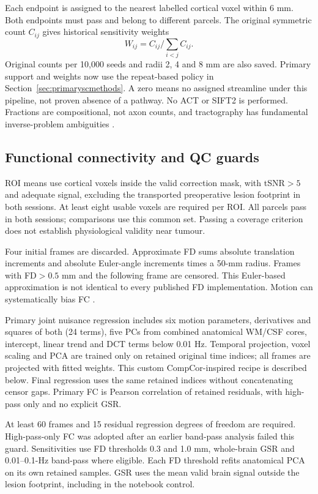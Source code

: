 \documentclass[11pt,a4paper]{article}
\begin{document}
Each endpoint is assigned to the nearest labelled cortical voxel within 6 mm. Both endpoints must pass and belong to different parcels. The original symmetric count $C_{ij}$ gives historical sensitivity weights
\begin{equation}W_{ij}=C_{ij}/\sum_{i<j} C_{ij}.\end{equation}
Original counts per 10,000 seeds and radii 2, 4 and 8 mm are also saved. Primary support and weights now use the repeat-based policy in Section~\ref{sec:primaryscmethods}. A zero means no assigned streamline under this pipeline, not proven absence of a pathway. No ACT or SIFT2 is performed. Fractions are compositional, not axon counts, and tractography has fundamental inverse-problem ambiguities \citep{maierhein2017}.

\subsection{Functional connectivity and QC guards}
ROI means use cortical voxels inside the valid correction mask, with tSNR$>5$ and adequate signal, excluding the transported preoperative lesion footprint in both sessions. At least eight usable voxels are required per ROI. All \CommonNodes{} parcels pass in both sessions; comparisons use this common set. Passing a coverage criterion does not establish physiological validity near tumour.

Four initial frames are discarded. Approximate FD sums absolute translation increments and absolute Euler-angle increments times a 50-mm radius. Frames with FD$>0.5$ mm and the following frame are censored. This Euler-based approximation is not identical to every published FD implementation. Motion can systematically bias FC \citep{power2012}.

Primary joint nuisance regression includes six motion parameters, derivatives and squares of both (24 terms), five PCs from combined anatomical WM/CSF cores, intercept, linear trend and DCT terms below 0.01 Hz. Temporal projection, voxel scaling and PCA are trained only on retained original time indices; all frames are projected with fitted weights. This custom CompCor-inspired recipe is described below. Final regression uses the same retained indices without concatenating censor gaps. Primary FC is Pearson correlation of retained residuals, with high-pass only and no explicit GSR.

At least 60 frames and 15 residual regression degrees of freedom are required. High-pass-only FC was adopted after an earlier band-pass analysis failed this guard. Sensitivities use FD thresholds 0.3 and 1.0 mm, whole-brain GSR and 0.01--0.1-Hz band-pass where eligible. Each FD threshold refits anatomical PCA on its own retained samples. GSR uses the mean valid brain signal outside the lesion footprint, including in the notebook control.
\end{document}
